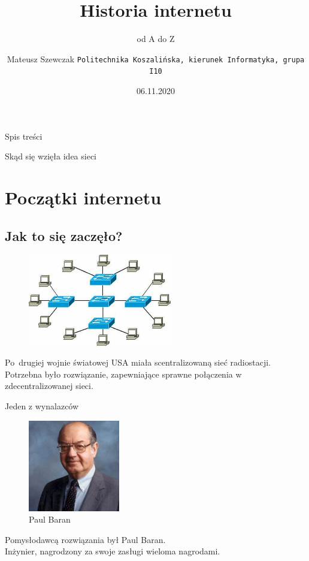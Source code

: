 \documentclass{beamer}
\title{Historia internetu}
\subtitle{od A do Z}
\author[Mateusz Szewczak]{Mateusz Szewczak
	\texttt{Politechnika Koszalińska, kierunek Informatyka, grupa I10}}
\date[Koszalin 2020]{06.11.2020}
\begin{document}
	
	\begin{frame}
		\maketitle
	\end{frame}
	\begin{frame}{Spis treści}
		\tableofcontents
	\end{frame}
	\begin{frame}{Skąd się wzięła idea sieci}
		\section{Początki internetu}
		\subsection{Jak to się zaczęło?}
		\begin{figure}
			\flushright
			\vspace{-30pt}
			\includegraphics[height=4cm]{gwiazda.jpg}
			\caption{\cite{SOISK.PL}}
		\end{figure}
		Po~drugiej wojnie światowej USA miała scentralizowaną sieć radiostacji. Potrzebna było rozwiązanie, zapewniające sprawne połączenia w zdecentralizowanej sieci.
		\nocite{hist:int:wiki}
	\end{frame}
	\begin{frame}{Jeden z wynalazców}
		\begin{figure}
			\flushright
			\vspace{-30pt}
			\includegraphics[height=4cm]{baran-zdjecie.jpg}
			\\Paul Baran
		\end{figure}
		Pomysłodawcą rozwiązania był Paul Baran. \\
		Inżynier, nagrodzony za swoje zasługi wieloma nagrodami.
	\end{frame}
\end{document}

